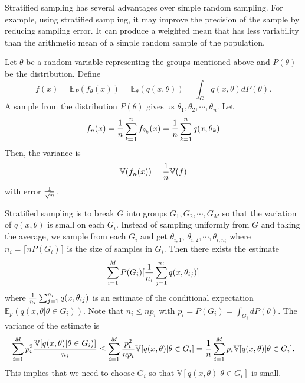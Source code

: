 Stratified sampling has several advantages over simple random sampling. For example, using stratified sampling, it may improve the precision of the sample by reducing sampling error. It can produce a weighted mean that has less variability than the arithmetic mean of a simple random sample of the population.

Let $\theta$ be a random variable representing the groups mentioned above and $P(\theta)$ be the distribution. Define
$$
f(x)=\mathbb{E}_{P} (f_{\theta}(x))=\mathbb{E}_{\theta} (q(x, \theta))=\int_G q(x,\theta) dP(\theta).
$$ 
A sample from the distribution $P(\theta)$ gives us $\theta_1, \theta_2, \cdots , \theta_n$. Let
\begin{equation}
f_n(x)={1\over n}\sum_{k=1}^n f_{ \theta_k}(x)={1\over n}\sum_{k=1}^n q(x, \theta_k)
\end{equation}
Then, the variance is 
\begin{equation}
\mathbb{V}(f_n(x))={1\over n}\mathbb{V}(f)
\end{equation}
with error ${1\over \sqrt{n}}$.

Stratified sampling is to break $G$ into groups $G_1, G_2, \cdots, G_M$ so that the variation of $q(x,\theta)$ is small on each $G_i$. Instead of sampling uniformly from $G$ and taking the average, we sample from each $G_i$ and get $\theta_{i,1}$, $\theta_{i,2}, \cdots, \theta_{i,n_i}$ where $n_i=\lceil nP(G_i)\rceil$ is the size of samples in $G_i$. Then there exists the estimate
\begin{equation}
\sum_{i=1}^M P(G_i)[{1\over n_i}\sum_{j=1}^{n_i} q(x,\theta_{ij})]
\end{equation}
where ${1\over n_i}\sum_{j=1}^{n_i} q(x,\theta_{ij})$ is an estimate of the conditional expectation $\mathbb{E}_p(q(x,\theta|\theta\in G_i))$. Note that $n_i\leq np_i$ with $p_i=P(G_i)=\int_{G_i} dP(\theta)$. The variance of the estimate is 
\begin{equation}
\sum_{i=1}^M p_i^2{\mathbb{V}[q(x,\theta)|\theta\in G_i)]\over n_i}
\leq \sum_{i=1}^M {p_i^2\over np_i}\mathbb{V}[q(x,\theta)|\theta\in G_i]
= {1\over n}\sum_{i=1}^M p_i\mathbb{V}[q(x,\theta)|\theta\in G_i].
\end{equation} 
This implies that we need to choose $G_i$ so that $\mathbb{V}[q(x,\theta)|\theta\in G_i]$ is small. 

